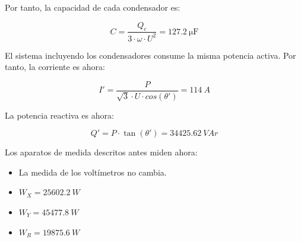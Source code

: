 \documentclass[12pt]{article}
\begin{document}
Por tanto, la capacidad de cada condensador es:

\[
  C = \frac{Q_c}{3 \cdot \omega \cdot U^2} = \SI{127.2}{\micro\farad}
\]

El sistema incluyendo los condensadores consume la misma potencia
activa. Por tanto, la corriente es ahora:

\[I' = \frac{P}{\sqrt{3} \cdot U \cdot cos(\theta')} = \SI{114}{A}\]

La potencia reactiva es ahora:

\[
  Q' = P \cdot \tan(\theta') = \SI{34425.62}{VAr}
\]

Los aparatos de medida descritos antes miden ahora:
\begin{itemize}
\item La medida de los voltímetros no cambia.
\item $W_X = \SI{25602.2}{W}$
\item $W_Y = \SI{45477.8}{W}$
\item $W_R = \SI{19875.6}{W}$
\end{itemize}
\end{document}
